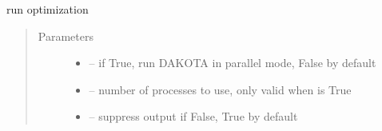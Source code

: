\documentclass[letterpaper,10pt,english]{sphinxmanual}
\begin{document}
\begin{fulllineitems}
\begin{fulllineitems}
\begin{quote}
\begin{description}
\end{description}\end{quote}

\end{fulllineitems}


\begin{fulllineitems}
\label{\detokenize{src/apidocs/dakopt:genopt.dakopt.DakotaOC.ref_flag}}
\end{fulllineitems}


\begin{fulllineitems}
\label{\detokenize{src/apidocs/dakopt:genopt.dakopt.DakotaOC.ref_x0}}
\end{fulllineitems}


\begin{fulllineitems}
\label{\detokenize{src/apidocs/dakopt:genopt.dakopt.DakotaOC.ref_y0}}
\end{fulllineitems}


\begin{fulllineitems}
\label{\detokenize{src/apidocs/dakopt:genopt.dakopt.DakotaOC.run}}
run optimization
\begin{quote}\begin{description}
\item[{Parameters}] \leavevmode\begin{itemize}
\item {} 
 -- if True, run DAKOTA in parallel mode, False by default

\item {} 
 -- number of processes to use, only valid when  is True

\item {} 
 -- suppress output if False, True by default

\end{itemize}

\end{description}\end{quote}


\end{fulllineitems}
\end{fulllineitems}
\end{document}
